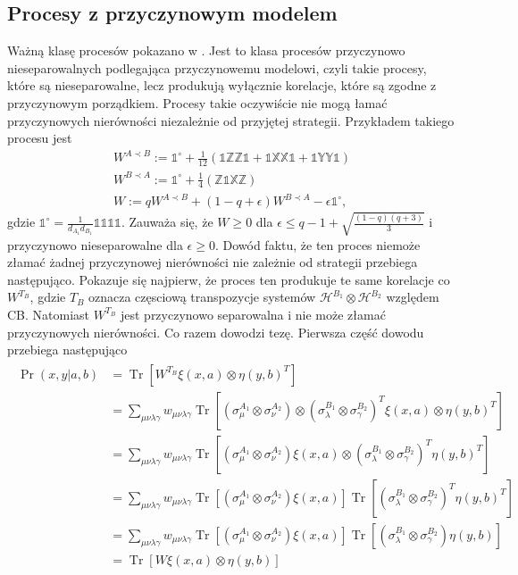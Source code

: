 \documentclass[10pt]{article} %
\DeclareMathOperator{\Trs}{Tr}
\newcommand{\Hx}[1]{\mathcal{H}^{#1}}
\newcommand{\X}{\mathbb{X}}
\newcommand{\Y}{\mathbb{Y}}
\newcommand{\Z}{\mathbb{Z}}
\newcommand{\I}{\mathbb{1}}
\newcommand{\IO}{\mathbb{1}^\circ}
\begin{document}
\subsection{Procesy z przyczynowym modelem}
Ważną klasę procesów pokazano w \cite{causal_model}. Jest to klasa procesów przyczynowo nieseparowalnych podlegająca przyczynowemu modelowi, czyli takie procesy, które są nieseparowalne, lecz produkują wyłącznie korelacje, które są zgodne z przyczynowym porządkiem. Procesy takie oczywiście nie mogą
łamać przyczynowych nierówności niezależnie od przyjętej strategii. Przykładem takiego procesu jest 
\begin{gather}
W^{A \prec B} := \IO + \frac{1}{12}(\I\Z\Z\I + \I\X\X\I + \I\Y\Y\I) \\
W^{B \prec A} := \IO + \frac{1}{4}(\Z\I\X\Z)\\
\label{eq:nsep_causal}
W := qW^{A \prec B} + (1-q+\epsilon)W^{B \prec A} -\epsilon\IO,
\end{gather} gdzie $\IO = \frac{1}{d_{A_1}d_{B_1}} \I\I\I\I$.
Zauważa się, że $W \geq 0$ dla $\epsilon \leq q- 1 + \sqrt{\frac{(1-q)(q+3)}{3}}$ i przyczynowo nieseparowalne dla $\epsilon \geq 0$. 
Dowód faktu, że ten proces niemoże złamać żadnej przyczynowej nierówności nie zależnie od strategii przebiega następująco.
Pokazuje się najpierw, że proces ten produkuje te same korelacje co $W^{T_B}$, gdzie $T_B$ oznacza częsciową transpozycje systemów $\Hx{B_1} \otimes \Hx{B_2}$ względem CB. Natomiast $W^{T_B}$ jest przyczynowo separowalna i nie może złamać przyczynowych nierówności. Co razem dowodzi tezę. Pierwsza część dowodu przebiega następująco 
\begin{align}
\begin{split}
\Pr(x,y|a,b) &= \Trs\left[W^{T_B} \xi(x,a) \otimes \eta(y,b)^{T}\right] \\
	&= \sum_{\mu\nu\lambda\gamma} w_{\mu\nu\lambda\gamma} \Trs \left[ (\sigma_\mu^{A_1}\otimes\sigma_\nu^{A_2})\otimes(\sigma_\lambda^{B_1}\otimes\sigma_\gamma^{B_2})^T \xi(x,a) \otimes \eta(y,b)^{T} \right] \\
	&= \sum_{\mu\nu\lambda\gamma} w_{\mu\nu\lambda\gamma} \Trs \left[ (\sigma_\mu^{A_1}\otimes\sigma_\nu^{A_2}) \xi(x,a) \otimes (\sigma_\lambda^{B_1}\otimes\sigma_\gamma^{B_2})^T\eta(y,b)^{T} \right] \\
	&= \sum_{\mu\nu\lambda\gamma} w_{\mu\nu\lambda\gamma}  \Trs \left[ (\sigma_\mu^{A_1}\otimes\sigma_\nu^{A_2}) \xi(x,a)\right] \Trs \left[ (\sigma_\lambda^{B_1}\otimes\sigma_\gamma^{B_2})^T\eta(y,b)^{T} \right] \\
	&= \sum_{\mu\nu\lambda\gamma} w_{\mu\nu\lambda\gamma}  \Trs \left[ (\sigma_\mu^{A_1}\otimes\sigma_\nu^{A_2}) \xi(x,a)\right] \Trs \left[ (\sigma_\lambda^{B_1}\otimes\sigma_\gamma^{B_2})\eta(y,b) \right] \\
	&=  \Trs\left[W \xi(x,a) \otimes \eta(y,b)\right]
\end{split}
\end{align}
\end{document}
